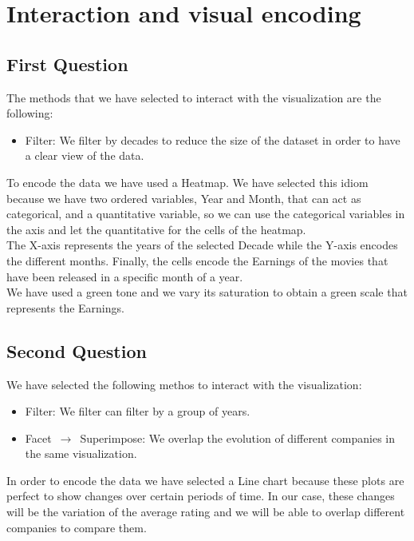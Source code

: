 \section{Interaction and visual encoding}

\subsection{First Question}

The methods that we have selected to interact with the visualization are the following:

\begin{itemize}
	\item Filter: We filter by decades to reduce the size of the dataset in order to have a clear view of the data.
\end{itemize}

To encode the data we have used a Heatmap. We have selected this idiom because we have two ordered variables, Year and Month, that can act as categorical, and a quantitative variable, so we can use the categorical variables in the axis and let the quantitative for the cells of the heatmap.\\

The X-axis represents the years of the selected Decade while the Y-axis encodes the different months. Finally, the cells encode the Earnings of the movies that have been released in a specific month of a year.\\

We have used a green tone and we vary its saturation to obtain a green scale that represents the Earnings.\\

\subsection{Second Question}

We have selected the following methos to interact with the visualization:

\begin{itemize}
	\item Filter: We filter can filter by a group of years.
	\item Facet $\,\to\,$ Superimpose: We overlap the evolution of different companies in the same visualization.
\end{itemize}

In order to encode the data we have selected a Line chart because these plots are perfect to show changes over certain periods of time. In our case, these changes will be the variation of the average rating and we will be able to overlap different companies to compare them.\\

